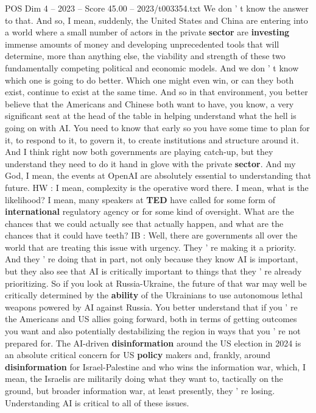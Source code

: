 \begin{textsample}{POS Dim 4 – 2023 – Score 45.00 – 2023/t003354.txt}
We don ' t know the answer to that.
And so, I mean, suddenly, the United States and China are entering into a world where a small number of actors in the private \textbf{sector} are \textbf{investing} immense amounts of money and developing unprecedented tools that will determine, more than anything else, the viability and strength of these two fundamentally competing political and economic models.
And we don ' t know which one is going to do better.
Which one might even win, or can they both exist, continue to exist at the same time.
And so in that environment, you better believe that the Americans and Chinese both want to have, you know, a very significant seat at the head of the table in helping understand what the hell is going on with AI.
You need to know that early so you have some time to plan for it, to respond to it, to govern it, to create institutions and structure around it.
And I think right now both governments are playing catch-up, but they understand they need to do it hand in glove with the private \textbf{sector}.
And my God, I mean, the events at OpenAI are absolutely essential to understanding that future.
HW : I mean, complexity is the operative word there.
I mean, what is the likelihood?
I mean, many speakers at \textbf{TED} have called for some form of \textbf{international} regulatory agency or for some kind of oversight.
What are the chances that we could actually see that actually happen, and what are the chances that it could have teeth?
IB : Well, there are governments all over the world that are treating this issue with urgency.
They ' re making it a priority.
And they ' re doing that in part, not only because they know AI is important, but they also see that AI is critically important to things that they ' re already prioritizing.
So if you look at Russia-Ukraine, the future of that war may well be critically determined by the \textbf{ability} of the Ukrainians to use autonomous lethal weapons powered by AI against Russia.
You better understand that if you ' re the Americans and US allies going forward, both in terms of getting outcomes you want and also potentially destabilizing the region in ways that you ' re not prepared for.
The AI-driven \textbf{disinformation} around the US election in 2024 is an absolute critical concern for US \textbf{policy} makers and, frankly, around \textbf{disinformation} for Israel-Palestine and who wins the information war, which, I mean, the Israelis are militarily doing what they want to, tactically on the ground, but broader information war, at least presently, they ' re losing.
Understanding AI is critical to all of these issues.

\end{textsample}
